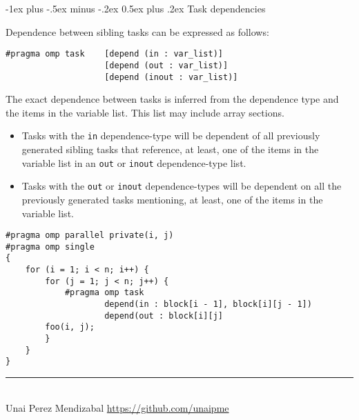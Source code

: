 \documentclass[10pt,landscape]{article}
\makeatletter
\renewcommand{\section}{\@startsection{section}{1}{0mm}%
                                {-1ex plus -.5ex minus -.2ex}%
                                {0.5ex plus .2ex}%
                                {\normalfont\large\bfseries}}
\makeatother
\begin{document}
\begin{multicols}{3}
\section{Task dependencies}
\par
Dependence between sibling tasks can be expressed as follows:
\begin{verbatim}
#pragma omp task    [depend (in : var_list)]
                    [depend (out : var_list)]
                    [depend (inout : var_list)]
\end{verbatim}
\par
The exact dependence between tasks is inferred from the dependence type and the items in the variable list. This list may include array sections.
\begin{itemize}
\item Tasks with the \texttt{in} dependence-type will be dependent of all previously generated sibling tasks that reference, at least, one of the items in the variable list in an \texttt{out} or \texttt{inout} dependence-type list.
\item Tasks with the \texttt{out} or \texttt{inout} dependence-types will be dependent on all the previously generated tasks mentioning, at least, one of the items in the variable list.
\end{itemize}
\begin{verbatim}
#pragma omp parallel private(i, j)
#pragma omp single
{
    for (i = 1; i < n; i++) {
        for (j = 1; j < n; j++) {
            #pragma omp task
                    depend(in : block[i - 1], block[i][j - 1])
                    depend(out : block[i][j]
        foo(i, j);
        }
    }
}
\end{verbatim}
\vfill
\hrule
~\\
Unai Perez Mendizabal \textcopyright \href{https://github.com/unaipme}{https://github.com/unaipme}
\end{multicols}
\end{document}
